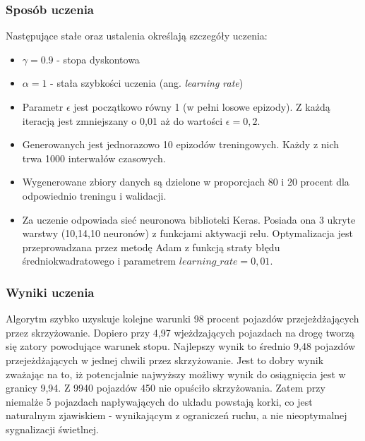 \documentclass[12pt]{book}
\theoremstyle{plain}
\begin{document}
\subsubsection{Sposób uczenia}
Następujące stałe oraz ustalenia określają szczegóły uczenia:
\begin{itemize}
	\item $\gamma = 0.9$ - stopa dyskontowa
	\item $\alpha = 1$ - stała szybkości uczenia (ang. \emph{learning rate})
	\item Parametr $\epsilon$ jest początkowo równy 1 (w pełni losowe epizody). Z każdą iteracją jest zmniejszany o 0,01 aż do wartości $\epsilon=0,2$.
	\item Generowanych jest jednorazowo 10 epizodów treningowych. Każdy z nich trwa 1000 interwałów czasowych.
	\item Wygenerowane zbiory danych są dzielone w proporcjach 80 i 20 procent dla odpowiednio treningu i walidacji.
	\item Za uczenie odpowiada sieć neuronowa biblioteki Keras. Posiada ona 3 ukryte warstwy (10,14,10 neuronów) z funkcjami aktywacji relu. Optymalizacja jest przeprowadzana przez metodę Adam z funkcją straty błędu średniokwadratowego i parametrem $learning\_rate = 0,01$. 
\end{itemize}

\subsubsection*{Wyniki uczenia}
Algorytm szybko uzyskuje kolejne warunki 98 procent pojazdów przejeżdżających przez skrzyżowanie. Dopiero przy 4,97 wjeżdzających pojazdach na drogę tworzą się zatory powodujące warunek stopu.
Najlepszy wynik to średnio 9,48 pojazdów przejeżdżających w jednej chwili przez skrzyżowanie. Jest to dobry wynik zważając na to, iż potencjalnie najwyższy możliwy wynik do osiągnięcia jest w granicy 9,94. Z 9940 pojazdów 450 nie opuściło skrzyżowania. Zatem przy niemalże 5 pojazdach napływających do układu powstają korki, co jest naturalnym zjawiskiem - wynikającym z ograniczeń ruchu, a nie nieoptymalnej sygnalizacji świetlnej.
\end{document}
